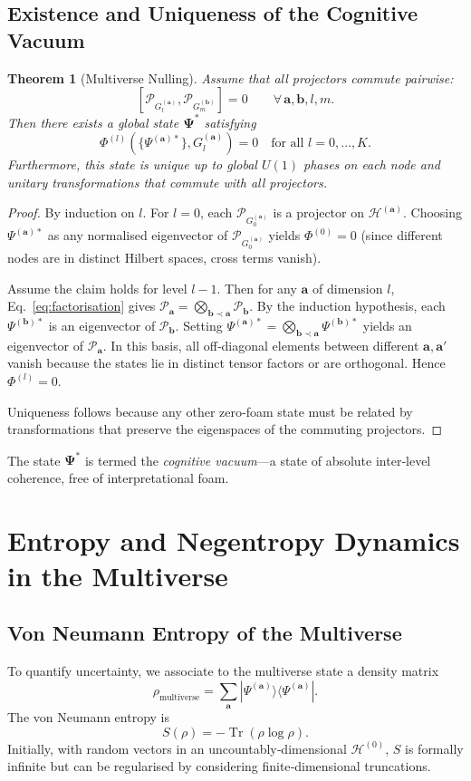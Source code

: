 \documentclass[11pt]{article}
\newtheorem{theorem}{Theorem}[section]
\DeclareMathOperator{\Tr}{Tr}
\newcommand{\cP}{\mathcal{P}}
\newcommand{\cH}{\mathcal{H}}
\begin{document}
\subsection{Existence and Uniqueness of the Cognitive Vacuum}
\begin{theorem}[Multiverse Nulling]
Assume that all projectors commute pairwise:
\[
[\cP_{G_l^{(\mathbf{a})}}, \cP_{G_m^{(\mathbf{b})}}] = 0 \qquad \forall\, \mathbf{a},\mathbf{b}, l,m.
\]
Then there exists a global state $\mathbf{\Psi}^*$ satisfying
\[
\Phi^{(l)}(\{\Psi^{(\mathbf{a})*}\}, G_l^{(\mathbf{a})}) = 0 \quad \text{for all } l=0,\dots,K.
\]
Furthermore, this state is unique up to global $U(1)$ phases on each node and unitary transformations that commute with all projectors.
\label{thm:nulling}
\end{theorem}
\begin{proof}
By induction on $l$. For $l=0$, each $\cP_{G_0^{(\mathbf{a})}}$ is a projector on $\cH^{(\mathbf{a})}$. Choosing $\Psi^{(\mathbf{a})*}$ as any normalised eigenvector of $\cP_{G_0^{(\mathbf{a})}}$ yields $\Phi^{(0)}=0$ (since different nodes are in distinct Hilbert spaces, cross terms vanish).

Assume the claim holds for level $l-1$. Then for any $\mathbf{a}$ of dimension $l$, Eq.~\eqref{eq:factorisation} gives $\cP_{\mathbf{a}} = \bigotimes_{\mathbf{b} \prec \mathbf{a}} \cP_{\mathbf{b}}$. By the induction hypothesis, each $\Psi^{(\mathbf{b})*}$ is an eigenvector of $\cP_{\mathbf{b}}$. Setting $\Psi^{(\mathbf{a})*} = \bigotimes_{\mathbf{b} \prec \mathbf{a}} \Psi^{(\mathbf{b})*}$ yields an eigenvector of $\cP_{\mathbf{a}}$. In this basis, all off‑diagonal elements between different $\mathbf{a},\mathbf{a}'$ vanish because the states lie in distinct tensor factors or are orthogonal. Hence $\Phi^{(l)}=0$.

Uniqueness follows because any other zero‑foam state must be related by transformations that preserve the eigenspaces of the commuting projectors.
\end{proof}

The state $\mathbf{\Psi}^*$ is termed the \emph{cognitive vacuum}---a state of absolute inter‑level coherence, free of interpretational foam.

\section{Entropy and Negentropy Dynamics in the Multiverse}
\label{sec:entropy}

\subsection{Von Neumann Entropy of the Multiverse}
To quantify uncertainty, we associate to the multiverse state a density matrix
\[
\rho_{\text{multiverse}} = \sum_{\mathbf{a}} |\Psi^{(\mathbf{a})}\rangle \langle \Psi^{(\mathbf{a})}|.
\]
The von Neumann entropy is
\[
S(\rho) = -\Tr(\rho \log \rho).
\]
Initially, with random vectors in an uncountably‑dimensional $\cH^{(0)}$, $S$ is formally infinite but can be regularised by considering finite‑dimensional truncations.
\end{document}
